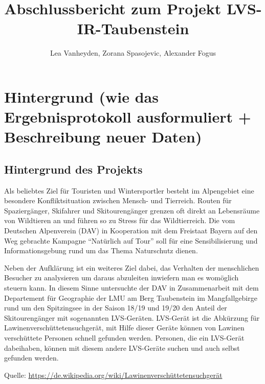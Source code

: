 \documentclass[11pt,a4paper]{report}
\title{Abschlussbericht zum Projekt LVS-IR-Taubenstein}
\author{Lea Vanheyden, Zorana Spasojevic, Alexander Fogus}
\begin{document}
	
\maketitle
	
\tableofcontents

\newpage

\chapter{Hintergrund (wie das Ergebnisprotokoll ausformuliert + Beschreibung neuer Daten)}

\section{Hintergrund des Projekts}
Als beliebtes Ziel für Touristen und Wintersportler besteht im Alpengebiet eine besondere Konfliktsituation zwischen Mensch- und Tierreich. Routen für Spaziergänger, Skifahrer und Skitourengänger grenzen oft direkt an Lebensräume von Wildtieren an und führen so zu Stress für das Wildtierreich. Die vom Deutschen Alpenverein (DAV) in Kooperation mit dem Freistaat Bayern auf den Weg gebrachte Kampagne "`Natürlich auf Tour"' soll für eine Sensibilisierung und Informationsgebung rund um das Thema Naturschutz dienen.

Neben der Aufklärung ist ein weiteres Ziel dabei, das Verhalten der menschlichen Besucher zu analysieren um daraus abzuleiten inwiefern man es womöglich steuern kann. In diesem Sinne untersuchte der DAV in Zusammenarbeit mit dem Departement für Geographie der LMU am Berg Taubenstein im Mangfallgebirge rund um den Spitzingsee in der Saison 18/19 und 19/20 den Anteil der Skitourengänger mit sogenannten LVS-Geräten. LVS-Gerät ist die Abkürzung für Lawinenverschüttetensuchgerät, mit Hilfe dieser Geräte können von Lawinen verschüttete Personen schnell gefunden werden. Personen, die ein LVS-Gerät dabeihaben, können mit diesem andere LVS-Geräte suchen und auch selbst gefunden werden.

Quelle:
\url{https://de.wikipedia.org/wiki/Lawinenverschüttetensuchgerät}
\end{document}
